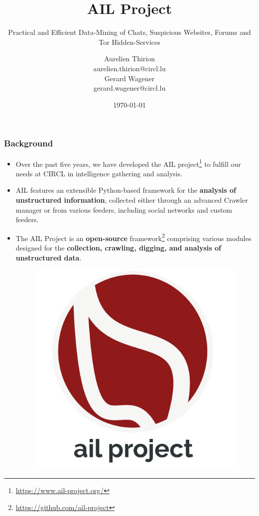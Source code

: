 \documentclass{beamer}
\author{\large{Aurelien Thirion}\\ \scriptsize{aurelien.thirion@circl.lu}\\ \large{Gerard Wagener}\\ \scriptsize{gerard.wagener@circl.lu}}
\title{AIL Project}
\subtitle{Practical and Efficient Data-Mining of Chats, Suspicious Websites, Forums and Tor Hidden-Services}
\institute{info@circl.lu}
\date{\today}
\begin{document}
\begin{frame}[t,plain]
\titlepage
\end{frame}

\begin{frame}
   \frametitle{Background}
\begin{itemize}
    \item Over the past five years, we have developed the AIL project\footnote{\url{https://www.ail-project.org/}} to fulfill our needs at CIRCL in intelligence gathering and analysis.
    \item AIL features an extensible Python-based framework for the {\bf analysis of unstructured information}, collected either through an advanced Crawler manager or from various feeders, including social networks and custom feeders.
    \item The AIL Project is an {\bf open-source} framework\footnote{\url{https://github.com/ail-project}} comprising various modules designed for the {\bf collection, crawling, digging, and analysis of unstructured data}.
	\begin{figure}
        \includegraphics[scale=0.1, angle=0]{images/ail-project.png}
    \end{figure}
\end{itemize}
\end{frame}
\end{document}
